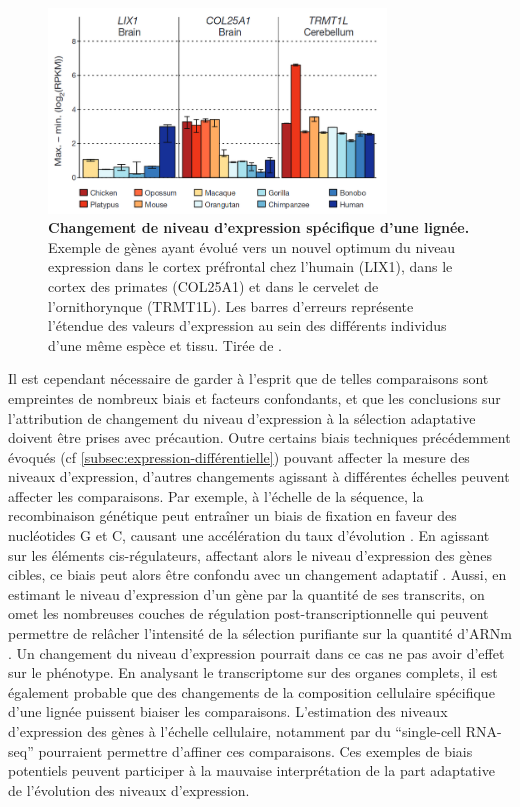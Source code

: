 \begin{figure}[h]
    \centering
    \includegraphics[width=0.8\textwidth, page=1] {figures/introduction/fig27.png}
    \caption[Changement de niveau d'expression spécifique d'une lignée.]{
    \textbf{Changement de niveau d'expression spécifique d'une lignée.}
    Exemple de gènes ayant évolué vers un nouvel optimum du niveau expression dans le cortex préfrontal chez l'humain (LIX1),  dans le cortex des primates (COL25A1) et dans le cervelet de l'ornithorynque (TRMT1L). Les barres d'erreurs représente l'étendue des valeurs d'expression au sein des différents individus d'une même espèce et tissu. Tirée de \citep{brawand_evolution_2011}.\\
    }
    \label{fig:Fig27}
\end{figure}

Il est cependant nécessaire de garder à l’esprit que de telles comparaisons sont empreintes de nombreux biais et facteurs confondants, et que les conclusions sur l’attribution de changement du niveau d’expression à la sélection adaptative doivent être prises avec précaution. Outre certains biais techniques précédemment évoqués (cf \ref{subsec:expression-différentielle}) pouvant affecter la mesure des niveaux d’expression, d’autres changements agissant à différentes échelles peuvent affecter les comparaisons. Par exemple, à l’échelle de la séquence, la recombinaison génétique peut entraîner un biais de fixation en faveur des nucléotides G et C, causant une accélération du taux d’évolution \citep{duret_biased_2009}. En agissant sur les éléments \gls{cis}-régulateurs, affectant alors le niveau d’expression des gènes cibles, ce biais peut alors être confondu avec un changement adaptatif \citep{capra_many_2013}. Aussi, en estimant le niveau d’expression d’un gène par la quantité de ses transcrits, on omet les nombreuses couches de régulation post-transcriptionnelle qui peuvent permettre de relâcher l’intensité de la sélection purifiante sur la quantité d’\acrshort{ARNm} \citep{wang_transcriptome_2020}. Un changement du niveau d’expression pourrait dans ce cas ne pas avoir d’effet sur le phénotype. En analysant le transcriptome sur des organes complets, il est également probable que des changements de la composition cellulaire spécifique d’une lignée puissent biaiser les comparaisons. L’estimation des niveaux d’expression des gènes à l’échelle cellulaire, notamment par du “single-cell \acrshort{RNA-seq}” pourraient permettre d’affiner ces comparaisons. Ces exemples de biais potentiels peuvent participer à la mauvaise interprétation de la part adaptative de l’évolution des niveaux d’expression.

